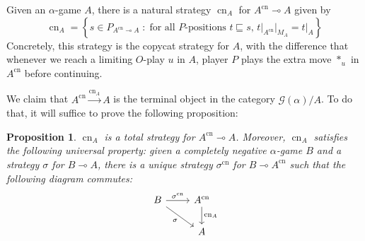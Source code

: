 \documentclass[11pt]{article} %
\theoremstyle{plain} %
\newtheorem{proposition}[theorem]{Proposition}
\theoremstyle{definition} %
\theoremstyle{note}
\theoremstyle{exercisestyle}
\newcommand{\map}[3]{#2\xrightarrow{#1} #3}
\renewcommand{\implies}{\multimap}
\newcommand{\G}{\mathcal G}
\newcommand{\suchthat}{\;\colon\;}
\newcommand{\prefix}{\sqsubseteq}
\DeclareMathOperator{\cn}{cn}
\begin{document}
Given an $\alpha$-game $A$, there is a natural strategy $\cn_A$ for $A^{\cn}\implies A$ given by
\[
  \cn_A = \left\{s\in P_{A^{\cn}\implies A}\suchthat\textrm{for all $P$-positions $t\prefix s$, $t\vert_{A^{\cn}}\vert_{M_A}=t\vert_A$}\right\}
  \]
Concretely, this strategy is the copycat strategy for $A$, with the difference that whenever we reach a limiting $O$-play $u$ in $A$, player $P$ plays the extra move $*_u$ in $A^{\cn}$ before continuing.

We claim that $\map{\cn_A}{A^{\cn}}{A}$ is the terminal object in the category $\G(\alpha)/A$.  To do that, it will suffice to prove the following proposition:

\begin{proposition}
  \label{CnUniversalProperty}
  $\cn_A$ is a total strategy for $A^{\cn}\implies A$.  Moreover, $\cn_A$ satisfies the following universal property: given a completely negative $\alpha$-game $B$ and a strategy $\sigma$ for $B\implies A$, there is a unique strategy $\sigma^{\cn}$ for $B\implies A^{\cn}$ such that the following diagram commutes:
  \[
    \begin{tikzcd}
      B \arrow[r, "\sigma^{\cn}"] \arrow[dr, "\sigma"']
        & A^{\cn} \arrow[d, "\cn_A"] \\
        & A
    \end{tikzcd}
    \]
\end{proposition}
\end{document}
